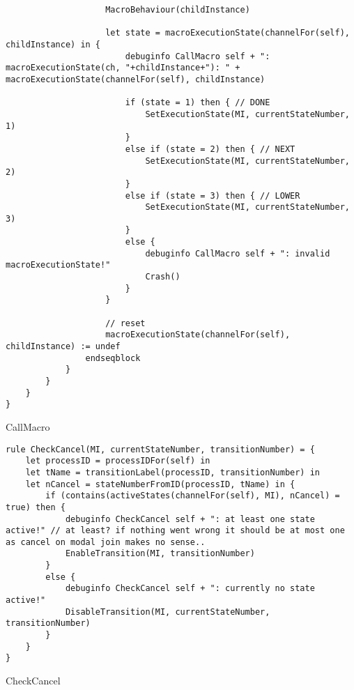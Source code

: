 \begin{listing}[H]
\begin{verbatim}
                    MacroBehaviour(childInstance)

                    let state = macroExecutionState(channelFor(self), childInstance) in {
                        debuginfo CallMacro self + ": macroExecutionState(ch, "+childInstance+"): " + macroExecutionState(channelFor(self), childInstance)

                        if (state = 1) then { // DONE
                            SetExecutionState(MI, currentStateNumber, 1)
                        }
                        else if (state = 2) then { // NEXT
                            SetExecutionState(MI, currentStateNumber, 2)
                        }
                        else if (state = 3) then { // LOWER
                            SetExecutionState(MI, currentStateNumber, 3)
                        }
                        else {
                            debuginfo CallMacro self + ": invalid macroExecutionState!"
                            Crash()
                        }
                    }

                    // reset
                    macroExecutionState(channelFor(self), childInstance) := undef
                endseqblock
            }
        }
    }
}
\end{verbatim}
\caption{CallMacro}
\label{lst:asm:CallMacro}
\end{listing}




\begin{listing}[H]
\begin{verbatim}
rule CheckCancel(MI, currentStateNumber, transitionNumber) = {
    let processID = processIDFor(self) in
    let tName = transitionLabel(processID, transitionNumber) in
    let nCancel = stateNumberFromID(processID, tName) in {
        if (contains(activeStates(channelFor(self), MI), nCancel) = true) then {
            debuginfo CheckCancel self + ": at least one state active!" // at least? if nothing went wrong it should be at most one as cancel on modal join makes no sense..
            EnableTransition(MI, transitionNumber)
        }
        else {
            debuginfo CheckCancel self + ": currently no state active!"
            DisableTransition(MI, currentStateNumber, transitionNumber)
        }
    }
}
\end{verbatim}
\caption{CheckCancel}
\label{lst:asm:CheckCancel}
\end{listing}





